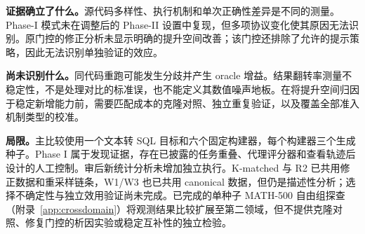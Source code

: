 \textbf{证据确立了什么。}源代码多样性、执行机制和单次正确性差异是不同的测量。Phase-I 模式未在调整后的 Phase-II 设置中复现，但多项协议变化使其原因无法识别。原门控的修正分析未显示明确的提升空间改善；该门控还排除了允许的提示策略，因此无法识别单独验证的效应。

\textbf{尚未识别什么。}同代码重跑可能发生分歧并产生 oracle 增益。结果翻转率测量不稳定性，不是处理对比的标准误，也不能定义其数值噪声地板。在将提升空间归因于稳定新增能力前，需要匹配成本的克隆对照、独立重复验证，以及覆盖全部准入机制类型的校准。

\textbf{局限。}主比较使用一个文本转 SQL 目标和六个固定构建器，每个构建器三个生成种子。Phase I 属于发现证据，存在已披露的任务重叠、代理评分器和查看轨迹后设计的人工控制。审后新统计分析未增加独立执行。K-matched 与 R2 已共用修正数据和重采样链条，W1/W3 也已共用 canonical 数据，但仍是描述性分析；选择不确定性与独立效用验证尚未完成。已完成的单种子 MATH-500 自由组探查（附录~\ref{app:crossdomain}）将观测结果比较扩展至第二领域，但不提供克隆对照、修复门控的析因实验或稳定互补性的独立检验。
